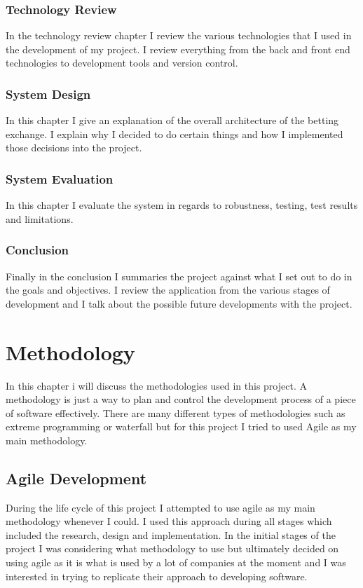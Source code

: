 \subsection{Technology Review}
In the technology review chapter I review the various technologies that I used in the development of my project. I review everything from the back and front end technologies to development tools and version control.

\subsection{System Design}
In this chapter I give an explanation of the overall architecture of the betting exchange. I explain why I decided to do certain things and how I implemented those decisions into the project.
\subsection{System Evaluation}
In this chapter I evaluate the system in regards to robustness, testing, test results and limitations. 

\subsection{Conclusion}
Finally in the conclusion I summaries the project against what I set out to do in the goals and objectives. I review the application from the various stages of development and I talk about the possible future developments with the project.

\chapter{Methodology}
In this chapter i will discuss the methodologies used in this project. A methodology is just a way to plan and control the development process of a piece of software effectively. There are many different types of methodologies such as extreme programming or waterfall but for this project I tried to used Agile as my main methodology.

\section{Agile Development}
During the life cycle of this project I attempted to use agile as my main methodology whenever I could. I used this approach during all stages which included the research, design and implementation. In the initial stages of the project I was considering what methodology to use but ultimately decided on using agile as it is what is used by a lot of companies at the moment and I was interested in trying to replicate their approach to developing software.

